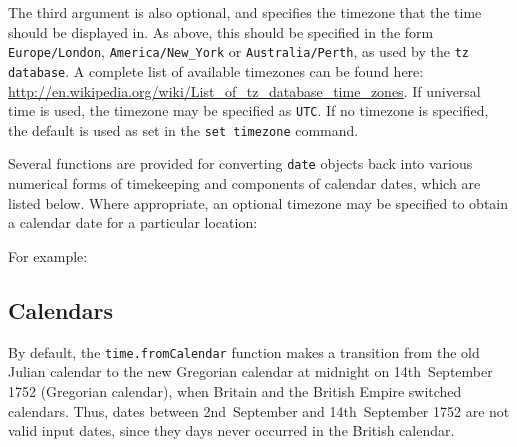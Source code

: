 The third argument is also optional, and specifies the timezone that the time
should be displayed in. As above, this should be specified in the form {\tt
Europe/London}, {\tt America/New\_York} or {\tt Australia/Perth}, as used by
the {\tt tz database}. A complete list of available timezones can be found
here: \url{http://en.wikipedia.org/wiki/List_of_tz_database_time_zones}.  If
universal time is used, the timezone may be specified as {\tt UTC}. If no
timezone is specified, the default is used as set in the {\tt set timezone}
command.

Several functions are provided for converting {\tt date} objects back into
various numerical forms of timekeeping and components of calendar dates, which
are listed below. Where appropriate, an optional timezone may be specified to
obtain a calendar date for a particular location:


For example:

\vspace{3mm}

\vspace{3mm}

\subsection{Calendars}

By default, the {\tt time.fromCalendar} function makes a transition from the
old Julian calendar to the new Gregorian calendar at midnight on 14th~September
1752 (Gregorian calendar), when Britain and the British Empire switched
calendars.  Thus, dates between 2nd~September and 14th~September 1752 are not
valid input dates, since they days never occurred in the British calendar.

